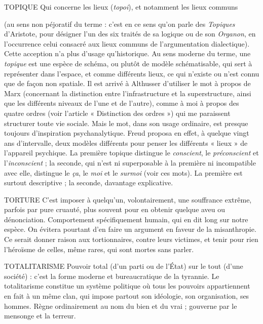 TOPIQUE Qui concerne les lieux ({\it topoi}), et notamment les lieux communs

(au sens non péjoratif du terme : c’est en ce sens qu’on parle des
{\it Topiques} d’Aristote, pour désigner l’un des six traités de sa logique ou de son
{\it Organon}, en l'occurrence celui consacré aux lieux communs de l’argumentation
dialectique). Cette acception n’a plus d’usage qu’historique. Au sens moderne
du terme, une {\it topique} est une espèce de schéma, ou plutôt de modèle schématisable,
qui sert à représenter dans l’espace, et comme différents lieux, ce qui
n'existe ou n’est connu que de façon non spatiale. Il est arrivé à Althusser d’utiliser
le mot à propos de Marx (concernant la distinction entre l’infrastructure
et la superstructure, ainsi que les différents niveaux de l’une et de l’autre),
comme à moi à propos des quatre ordres (voir l’article « Distinction des
ordres ») qui me paraissent structurer toute vie sociale. Mais le mot, dans son
usage ordinaire, est presque toujours d'inspiration psychanalytique. Freud proposa
en effet, à quelque vingt ans d’intervalle, deux modèles différents pour
penser les différents « lieux » de l'appareil psychique. La première topique distingue
le {\it conscient}, le {\it préconscient} et l'{\it inconscient} ; la seconde, qui n’est ni superposable
à la première ni incompatible avec elle, distingue le {\it ça}, le {\it moi} et le
{\it surmoi} (voir ces mots). La première est surtout descriptive ; la seconde, davantage
explicative.

TORTURE C'est imposer à quelqu'un, volontairement, une souffrance
extrême, parfois par pure cruauté, plus souvent pour en obtenir
quelque aveu ou dénonciation. Comportement spécifiquement humain, qui en
dit long sur notre espèce. On évitera pourtant d’en faire un argument en faveur
de la misanthropie. Ce serait donner raison aux tortionnaires, contre leurs victimes,
et tenir pour rien l’héroïsme de celles, même rares, qui sont mortes sans
parler.

TOTALITARISME Pouvoir total (d’un parti ou de l’État) sur le tout (d’une
société) : c’est la forme moderne et bureaucratique de la
tyrannie. Le totalitarisme constitue un système politique où tous les pouvoirs
appartiennent en fait à un même clan, qui impose partout son idéologie, son
organisation, ses hommes. Règne ordinairement au nom du bien et du vrai ;
gouverne par le mensonge et la terreur.

